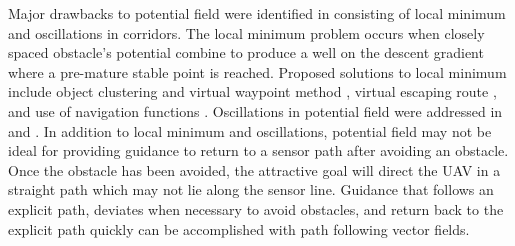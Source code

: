 \documentclass[conf]{new-aiaa}
\begin{document}
%
%






Major drawbacks to potential field were identified in \cite{koren_potential_1991} consisting of local minimum and oscillations in corridors. The local minimum problem occurs when closely spaced obstacle's potential combine to produce a well on the descent gradient where a pre-mature stable point is reached. Proposed solutions to local minimum include object clustering and virtual waypoint method \cite{liu_virtual-waypoint_2016}, virtual escaping route \cite{kim_escaping_2009}, and use of navigation functions \cite{goerzen_survey_2010}. Oscillations in potential field were addressed in \cite{lei_tang_novel_2010} and \cite{li_efficient_2012}. In addition to local minimum and oscillations, potential field may not be ideal for providing guidance to return to a sensor path after avoiding an obstacle. Once the obstacle has been avoided, the attractive goal will direct the UAV in a straight path which may not lie along the sensor line. Guidance that follows an explicit path, deviates when necessary to avoid obstacles, and return back to the explicit path quickly can be accomplished with path following vector fields.  \\


\end{document}
